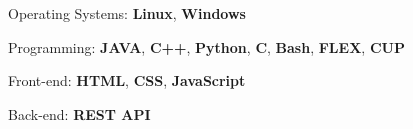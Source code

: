 

\begin{cvskills}


  \cvskill
    {Operating Systems:} %
    {\textbf{Linux}, \textbf{Windows}} %

  \cvskill
    {Programming:} %
    {\textbf{JAVA}, \textbf{C++}, \textbf{Python}, \textbf{C}, \textbf{Bash}, \textbf{FLEX}, \textbf{CUP}} %

  \cvskill
    {Front-end:} %
    {\textbf{HTML}, \textbf{CSS}, \textbf{JavaScript}} %

  \cvskill
    {Back-end:} %
    {\textbf{REST API}} %

\end{cvskills}
